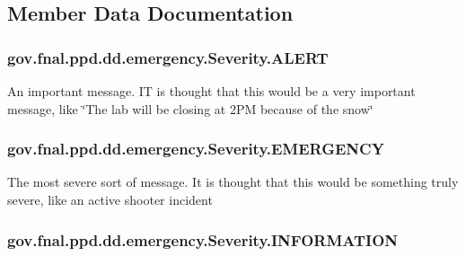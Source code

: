 \subsection{Member Data Documentation}
\hypertarget{enumgov_1_1fnal_1_1ppd_1_1dd_1_1emergency_1_1Severity_ab2b0f7c4e6222e22432f49393a71091c}{
\subsubsection[{A\-L\-E\-R\-T}]{\setlength{\rightskip}{0pt plus 5cm}gov.\-fnal.\-ppd.\-dd.\-emergency.\-Severity.\-A\-L\-E\-R\-T}}\label{enumgov_1_1fnal_1_1ppd_1_1dd_1_1emergency_1_1Severity_ab2b0f7c4e6222e22432f49393a71091c}
An important message. I\-T is thought that this would be a very important message, like \char`\"{}\-The lab will be closing at 2\-P\-M because of the snow\char`\"{} \hypertarget{enumgov_1_1fnal_1_1ppd_1_1dd_1_1emergency_1_1Severity_a611bc0cf1463a7419a9d2cd14c683578}{
\subsubsection[{E\-M\-E\-R\-G\-E\-N\-C\-Y}]{\setlength{\rightskip}{0pt plus 5cm}gov.\-fnal.\-ppd.\-dd.\-emergency.\-Severity.\-E\-M\-E\-R\-G\-E\-N\-C\-Y}}\label{enumgov_1_1fnal_1_1ppd_1_1dd_1_1emergency_1_1Severity_a611bc0cf1463a7419a9d2cd14c683578}
The most severe sort of message. It is thought that this would be something truly severe, like an active shooter incident \hypertarget{enumgov_1_1fnal_1_1ppd_1_1dd_1_1emergency_1_1Severity_aaf755550765aa7e569baf503397ecd12}{
\subsubsection[{I\-N\-F\-O\-R\-M\-A\-T\-I\-O\-N}]{\setlength{\rightskip}{0pt plus 5cm}gov.\-fnal.\-ppd.\-dd.\-emergency.\-Severity.\-I\-N\-F\-O\-R\-M\-A\-T\-I\-O\-N}}\label{enumgov_1_1fnal_1_1ppd_1_1dd_1_1emergency_1_1Severity_aaf755550765aa7e569baf503397ecd12}
